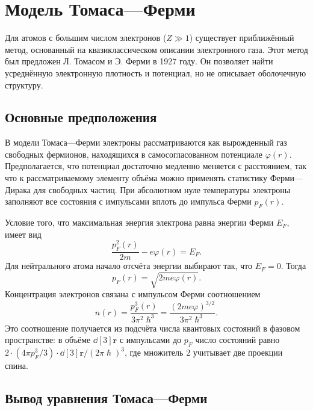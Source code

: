 \documentclass[a4paper, 12pt]{article}
\numberwithin{equation}{section}
\begin{document}
\section{Модель Томаса---Ферми}
\label{sec:thomas_fermi}

Для атомов с большим числом электронов ($Z \gg 1$) существует приближённый метод, основанный на квазиклассическом описании электронного газа. Этот метод был предложен Л. Томасом и Э. Ферми в 1927 году. Он позволяет найти усреднённую электронную плотность и потенциал, но не описывает оболочечную структуру.

\subsection{Основные предположения}
\label{subsec:tf_assumptions}

В модели Томаса---Ферми электроны рассматриваются как вырожденный газ свободных фермионов, находящихся в самосогласованном потенциале $\varphi(r)$. Предполагается, что потенциал достаточно медленно меняется с расстоянием, так что к рассматриваемому элементу объёма можно применять статистику Ферми---Дирака для свободных частиц. При абсолютном нуле температуры электроны заполняют все состояния с импульсами вплоть до импульса Ферми $p_F(r)$.

Условие того, что максимальная энергия электрона равна энергии Ферми $E_F$, имеет вид
\begin{equation}
\label{eq:fermi_energy}
\frac{p_F^2(r)}{2m} - e \varphi(r) = E_F.
\end{equation}
Для нейтрального атома начало отсчёта энергии выбирают так, что $E_F = 0$. Тогда
\begin{equation}
\label{eq:fermi_momentum}
p_F(r) = \sqrt{2 m e \varphi(r)}.
\end{equation}
Концентрация электронов связана с импульсом Ферми соотношением
\begin{equation}
\label{eq:electron_density_tf}
n(r) = \frac{p_F^3(r)}{3 \pi^2 \hslash^3} = \frac{(2 m e \varphi)^{3/2}}{3 \pi^2 \hslash^3}.
\end{equation}
Это соотношение получается из подсчёта числа квантовых состояний в фазовом пространстве: в объёме $\dd[3]{\bm{r}}$ с импульсами до $p_F$ число состояний равно $2 \cdot (4\pi p_F^3/3) \cdot \dd[3]{\bm{r}} / (2\pi \hslash)^3$, где множитель $2$ учитывает две проекции спина.

\subsection{Вывод уравнения Томаса---Ферми}
\label{subsec:tf_derivation}
\end{document}
